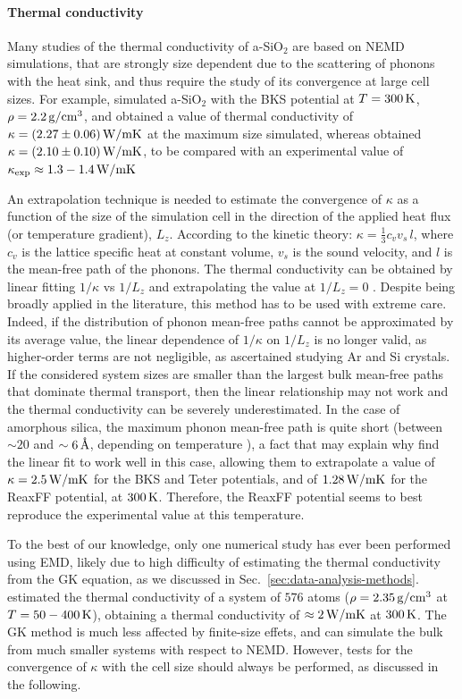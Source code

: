 \paragraph{Thermal conductivity}
Many studies of the thermal conductivity of a-SiO$_2$ are based on NEMD simulations, that are strongly size dependent due to the scattering of phonons with the heat sink, and thus require the study of its convergence at large cell sizes. 
For example, \citet{Tian2017} simulated a-SiO$_2$ with the BKS potential at $T=300\,\mathrm{K}$, $\rho=2.2\,\mathrm{g/cm^3}$, and obtained a value of thermal conductivity of $\kappa=(2.27 \pm 0.06)\,\mathrm{W/mK}$ at the maximum size simulated, whereas \citet{Coquil2011} obtained $\kappa= (2.10 \pm 0.10)\,\mathrm{W/mK}$, to be compared with an experimental value of $\kappa_\mathrm{exp}\approx 1.3 - 1.4 \,\mathrm{W/mK}$

An extrapolation technique is needed to estimate the convergence of $\kappa$ as a function of the size of the simulation cell in the direction of the applied heat flux (or temperature gradient), $L_z$. According to the kinetic theory: $\kappa = \frac{1}{3} c_v v_s \,l$, where $c_v$ is the lattice specific heat at constant volume, $v_s$ is the sound velocity, and $l$ is the mean-free path of the phonons. The thermal conductivity can be obtained by linear fitting $1/\kappa$ vs $1/L_z$ and extrapolating the value at $1/L_z=0$ \cite{Schelling2002}. 
Despite being broadly applied in the literature, this method has to be used with extreme care. Indeed, if the distribution of phonon mean-free paths cannot be approximated by its average value, the linear dependence of $1/\kappa$ on $1/L_z$ is no longer valid, as higher-order terms are not negligible, as \citet{Sellan2010} ascertained studying Ar and Si crystals. If the considered system sizes are smaller than the largest bulk mean-free paths that dominate thermal transport, then the linear relationship may not work and the thermal conductivity can be severely underestimated. 
In the case of amorphous silica, the maximum phonon mean-free path is quite short (between $\sim 20$ and $\sim 6\,\mathrm{{\mbox{\AA}}}$, depending on temperature \cite{Yu2006}), a fact that may explain why \citet{Tian2017} find the linear fit to work well in this case, allowing them to extrapolate a value of $\kappa=2.5\,\mathrm{W/mK}$ for the BKS and Teter potentials, and of $1.28\,\mathrm{W/mK}$ for the ReaxFF potential, at $300\,\mathrm{K}$. Therefore, the ReaxFF potential seems to best reproduce the experimental value at this temperature. 

To the best of our knowledge, only one numerical study has ever been performed using EMD, likely due to high difficulty of estimating the thermal conductivity from the GK equation, as we discussed in Sec.~\ref{sec:data-analysis-methods}.
\citet{McGaughey2004b} estimated the thermal conductivity of a system of $576$ atoms ($\rho=2.35\,\mathrm{g/cm^3}$ at $T = 50-400 \,\mathrm{K}$), obtaining a thermal conductivity of $\approx 2\,\mathrm{W/mK}$ at $300\,\mathrm{K}$. 
The GK method is much less affected by finite-size effets, and can simulate the bulk from much smaller systems with respect to NEMD. However, tests for the convergence of $\kappa$ with the cell size should always be performed, as discussed in the following. 

